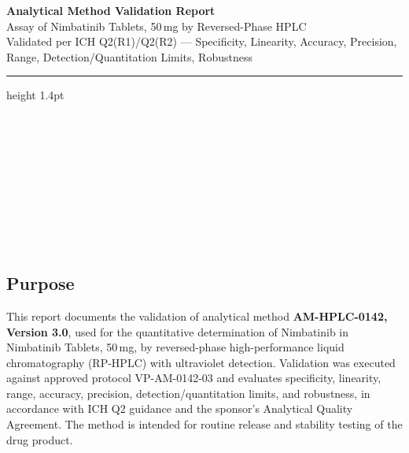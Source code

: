 \begin{center}
  {\color{valnavy}\Huge\bfseries Analytical Method Validation Report}\\[6pt]
  {\color{valblue}\Large Assay of Nimbatinib Tablets, 50\,mg by Reversed-Phase HPLC}\\[4pt]
  {\small\color{valslate}Validated per ICH Q2(R1)/Q2(R2) --- Specificity, Linearity, Accuracy, Precision, Range, Detection/Quantitation Limits, Robustness}
\end{center}

\vspace{6pt}
{\color{valmistline}\hrule height 1.4pt}
\vspace{10pt}

\begin{minipage}[t]{0.485\linewidth}
\begin{fieldbox}
\\[3pt]
\\[3pt]
\\[3pt]
\\[3pt]
\end{fieldbox}
\end{minipage}\hfill
\begin{minipage}[t]{0.485\linewidth}
\begin{fieldbox}
\\[3pt]
\\[3pt]
\\[3pt]
\\[3pt]
\end{fieldbox}
\end{minipage}
\par

\vspace{10pt}

\subsection*{\color{valnavy}Purpose}
This report documents the validation of analytical method \textbf{AM-HPLC-0142, Version 3.0},
used for the quantitative determination of Nimbatinib in Nimbatinib Tablets, 50\,mg, by
reversed-phase high-performance liquid chromatography (RP-HPLC) with ultraviolet detection.
Validation was executed against approved protocol VP-AM-0142-03 and evaluates specificity,
linearity, range, accuracy, precision, detection/quantitation limits, and robustness, in
accordance with ICH Q2 guidance and the sponsor's Analytical Quality Agreement. The method is
intended for routine release and stability testing of the drug product.

